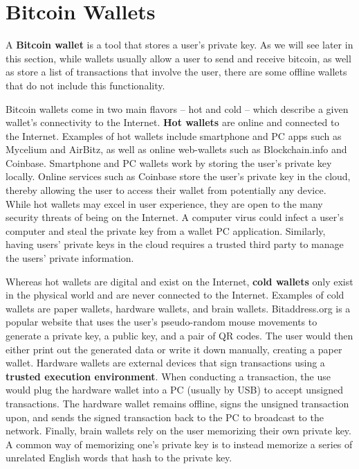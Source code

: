 \documentclass[11pt]{article}
\begin{document}
    \section*{Bitcoin Wallets}
    
    A \textbf{Bitcoin wallet} is a tool that stores a user's private key. As we will see later in this section, while wallets usually allow a user to send and receive bitcoin, as well as store a list of transactions that involve the user, there are some offline wallets that do not include this functionality. 
    
    Bitcoin wallets come in two main flavors -- hot and cold -- which describe a given wallet's connectivity to the Internet. \textbf{Hot wallets} are online and connected to the Internet. Examples of hot wallets include smartphone and PC apps such as Mycelium and AirBitz, as well as online web-wallets such as Blockchain.info and Coinbase. Smartphone and PC wallets work by storing the user's private key locally. Online services such as Coinbase store the user's private key in the cloud, thereby allowing the user to access their wallet from potentially any device. While hot wallets may excel in user experience, they are open to the many security threats of being on the Internet. A computer virus could infect a user's computer and steal the private key from a wallet PC application. Similarly, having users' private keys in the cloud requires a trusted third party to manage the users' private information.
    
    Whereas hot wallets are digital and exist on the Internet, \textbf{cold wallets} only exist in the physical world and are never connected to the Internet. Examples of cold wallets are paper wallets, hardware wallets, and brain wallets. Bitaddress.org is a popular website that uses the user's pseudo-random mouse movements to generate a private key, a public key, and a pair of QR codes. The user would then either print out the generated data or write it down manually, creating a paper wallet. Hardware wallets are external devices that sign transactions using a \textbf{trusted execution environment}. When conducting a transaction, the use would plug the hardware wallet into a PC (usually by USB) to accept unsigned transactions. The hardware wallet remains offline, signs the unsigned transaction upon, and sends the signed transaction back to the PC to broadcast to the network. Finally, brain wallets rely on the user memorizing their own private key. A common way of memorizing one's private key is to instead memorize a series of unrelated English words that hash to the private key. 
    
\end{document}
